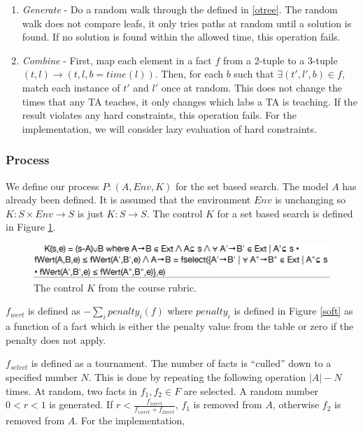 \documentclass{article}
\begin{document}
\begin{enumerate}

\item \textit{Generate} - Do a random walk through the defined in
  \ref{otree}. The random walk does not compare leafs, it only tries
  paths at random until a solution is found. If no solution is found
  within the allowed time, this operation fails.

\item \textit{Combine} - First, map each element in a fact $f$ from a
  2-tuple to a 3-tuple $(t, l) \to (t, l, b = time(l))$. Then, for
  each $b$ such that $\exists (t',l',b) \in f$, match each instance of
  $t'$ and $l'$ once at random. This does not change the times that
  any TA teaches, it only changes which labs a TA is teaching. If the
  result violates any hard constraints, this operation fails. For the
  implementation, we will consider lazy evaluation of hard
  constraints.
\end{enumerate}


\subsubsection{Process}

We define our process $P: (A, Env, K)$ for the set based search. The
model $A$ has already been defined. It is assumed that the environment
$Env$ is unchanging so $K: S \times Env \to S$ is just $K: S \to S$.
The control $K$ for a set based search is defined in Figure \ref{control}.

\begin{figure}
\centering
\includegraphics{control}
\caption{\label{control} The control $K$ from the course rubric.}
\end{figure}

$f_{wert}$ is defined as $-\sum\limits_{i}^{} penalty_i(f)$ where $
penalty_i$ is defined in Figure \ref{soft} as a function of a fact
which is either the penalty value from the table or zero if the
penalty does not apply.

$f_{select}$ is defined as a tournament. The number of facts is
``culled'' down to a specified number $N$. This is done by repeating
the following operation $|A|-N$ times. At random, two facts in $f_1,
f_2 \in F$ are selected. A random number $0 < r < 1$ is generated. If
$r < \frac{f_{1wert}}{f_{1wert} + f_{2wert}}$, $f_1$ is removed from
$A$, otherwise $f_2$ is removed from $A$. For the implementation,
\end{document}
